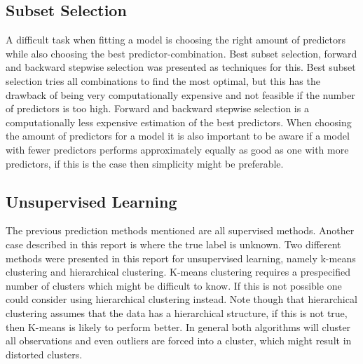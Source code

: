 \subsection{Subset Selection}
A difficult task when fitting a model is choosing the right amount of predictors while also choosing the best predictor-combination. Best subset selection, forward and backward stepwise selection was presented as techniques for this. Best subset selection tries all combinations to find the most optimal, but this has the drawback of being very computationally expensive and not feasible if the number of predictors is too high. Forward and backward stepwise selection is a computationally less expensive estimation of the best predictors. When choosing the amount of predictors for a model it is also important to be aware if a model with fewer predictors performs approximately equally as good as one with more predictors, if this is the case then simplicity might be preferable.

\subsection{Unsupervised Learning}
The previous prediction methods mentioned are all supervised methods. Another case described in this report is where the true label is unknown. Two different methods were presented in this report for unsupervised learning, namely k-means clustering and hierarchical clustering. K-means clustering requires a prespecified  number of clusters which might be difficult to know. If this is not possible one could consider using hierarchical clustering instead. Note though that hierarchical clustering assumes that the data has a hierarchical structure, if this is not true, then K-means is likely to perform better. In general both algorithms will cluster all observations and even outliers are forced into a cluster, which might result in distorted clusters.